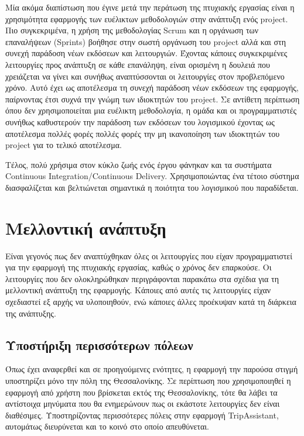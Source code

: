 \documentclass[oneside, 12pt]{book}
\begin{document}
Μία ακόμα διαπίστωση που έγινε μετά την περάτωση της πτυχιακής εργασίας είναι η χρησιμότητα εφαρμογής των ευέλικτων μεθοδολογιών στην ανάπτυξη ενός project.
Πιο συγκεκριμένα, η χρήση της μεθοδολογίας Scrum και η οργάνωση των επαναλήψεων (Sprints) βοήθησε στην σωστή οργάνωση του project αλλά και στη συνεχή παράδοση νέων εκδόσεων και λειτουργιών.
Έχοντας κάποιες συγκεκριμένες λειτουργίες προς ανάπτυξη σε κάθε επανάληψη, είναι ορισμένη η δουλειά που χρειάζεται να γίνει και συνήθως αναπτύσσονται οι λειτουργίες στον προβλεπόμενο χρόνο. Αυτό έχει ως αποτέλεσμα τη συνεχή παράδοση νέων εκδόσεων της εφαρμογής, παίρνοντας έτσι συχνά την γνώμη των ιδιοκτητών του project.
Σε αντίθετη περίπτωση όπου δεν χρησιμοποιείται μια ευέλικτη μεθοδολογία, η ομάδα και οι προγραμματιστές συνήθως καθυστερούν την παράδοση των εκδόσεων του λογισμικού έχοντας ως αποτέλεσμα πολλές φορές πολλές φορές την μη ικανοποίηση των ιδιοκτητών του project για το τελικό αποτέλεσμα.

Τέλος, πολύ χρήσιμα στον κύκλο ζωής ενός έργου φάνηκαν και τα συστήματα Continuous Integration/Continuous Delivery.
Χρησιμοποιώντας ένα τέτοιο σύστημα διασφαλίζεται και βελτιώνεται σημαντικά η ποιότητα του λογισμικού που παραδίδεται.

\section{Μελλοντική ανάπτυξη}
Είναι γεγονός πως δεν αναπτύχθηκαν όλες οι λειτουργίες που είχαν 
προγραμματιστεί για την εφαρμογή της πτυχιακής εργασίας, καθώς ο 
χρόνος δεν επαρκούσε. Οι λειτουργίες που δεν ολοκληρώθηκαν 
περιγράφονται παρακάτω στα σχέδια για τη μελλοντική ανάπτυξη της 
εφαρμογής. Κάποιες από αυτές τις λειτουργίες είχαν σχεδιαστεί εξ 
αρχής να υλοποιηθούν, ενώ κάποιες άλλες προέκυψαν κατά τη διάρκεια 
της ανάπτυξης.

\subsection{Υποστήριξη περισσότερων πόλεων}
Όπως έχει αναφερθεί και σε προηγούμενες ενότητες, η εφαρμογή την 
παρούσα στιγμή υποστηρίζει μόνο την πόλη της Θεσσαλονίκης. 
Σε περίπτωση που χρησιμοποιηθεί η εφαρμογή από χρήστη που βρίσκεται 
εκτός της Θεσσαλονίκης, τότε θα λάβει τα αντίστοιχα μηνύματα που θα 
ενημερώνουν πως οι εκάστοτε λειτουργίες δεν είναι διαθέσιμες.
Υποστηρίζοντας περισσότερες πόλεις στην εφαρμογή TripAssistant, 
αυτομάτως διευρύνεται και το κοινό στο οποίο απευθύνεται.
\end{document}

